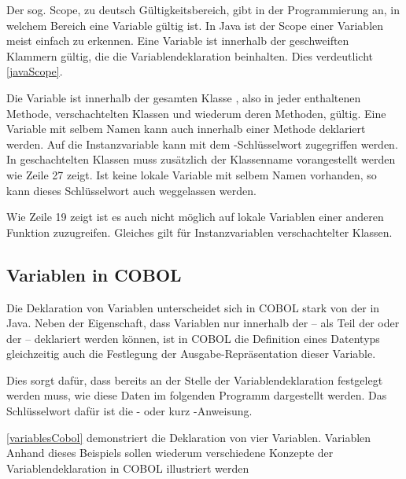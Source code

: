 Der sog. Scope, zu deutsch Gültigkeitsbereich, gibt in der Programmierung an, in welchem Bereich eine Variable gültig ist. In Java ist der Scope einer Variablen meist einfach zu erkennen. Eine Variable ist innerhalb der geschweiften Klammern gültig, die die Variablendeklaration beinhalten. Dies verdeutlicht \autoref{javaScope}.

Die Variable  ist innerhalb der gesamten Klasse , also in jeder enthaltenen Methode, verschachtelten Klassen und wiederum deren Methoden, gültig. Eine Variable mit selbem Namen kann auch innerhalb einer Methode deklariert werden. Auf die Instanzvariable kann mit dem -Schlüsselwort zugegriffen werden. In geschachtelten Klassen muss zusätzlich der Klassenname vorangestellt werden wie Zeile 27 zeigt.  Ist keine lokale Variable mit selbem Namen vorhanden, so kann dieses Schlüsselwort auch weggelassen werden. 

Wie Zeile 19 zeigt ist es auch nicht möglich auf lokale Variablen einer anderen Funktion zuzugreifen. Gleiches gilt für Instanzvariablen verschachtelter Klassen.


\subsection*{Variablen in COBOL}
Die Deklaration von Variablen unterscheidet sich in COBOL stark von der in Java. Neben der Eigenschaft, dass Variablen nur innerhalb der  -- als Teil der  oder der  -- deklariert werden können, ist in COBOL die Definition eines Datentyps gleichzeitig auch die Festlegung der Ausgabe-Repräsentation dieser Variable. 

Dies sorgt dafür, dass bereits an der Stelle der Variablendeklaration festgelegt werden muss, wie diese Daten im folgenden Programm dargestellt werden. Das Schlüsselwort dafür ist die - oder kurz -Anweisung.

\sepCodeAndOutputCheck
{}

\autoref{variablesCobol} demonstriert die Deklaration von vier Variablen. Variablen Anhand dieses Beispiels sollen wiederum verschiedene Konzepte der Variablendeklaration in COBOL illustriert werden

